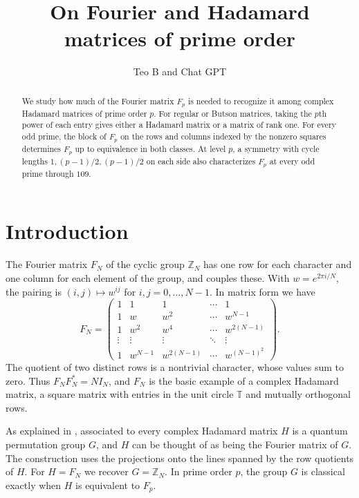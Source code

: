 \documentclass[11pt,a4paper]{article}
\title{On Fourier and Hadamard matrices of prime order}
\author{Teo B and Chat GPT}
\date{}
\numberwithin{equation}{section}
\begin{document}
\maketitle
\begin{abstract}
We study how much of the Fourier matrix $F_p$ is needed to recognize it among complex Hadamard matrices of prime order $p$. For regular or Butson matrices, taking the $p$th power of each entry gives either a Hadamard matrix or a matrix of rank one. For every odd prime, the block of $F_p$ on the rows and columns indexed by the nonzero squares determines $F_p$ up to equivalence in both classes. At level $p$, a symmetry with cycle lengths $1,(p-1)/2,(p-1)/2$ on each side also characterizes $F_p$ at every odd prime through $109$.
\end{abstract}

\begingroup
\color{magenta}
\hypersetup{linkcolor=magenta}
\setlength{\parskip}{0pt}
\makeatletter
\patchcmd{\l@section}{\addvspace{1.0em \@plus\p@}}{\addvspace{0pt}}{}{}
\makeatother
\tableofcontents
\endgroup

\section*{Introduction}
The Fourier matrix $F_N$ of the cyclic group $\mathbb Z_N$ has one row for each character and one column for each element of the group, and couples these. With $w=e^{2\pi i/N}$, the pairing is $(i,j)\mapsto w^{ij}$ for $i,j=0,\ldots,N-1$. In matrix form we have
\[
 F_N=
 \begin{pmatrix}
  1&1&1&\cdots&1\\
  1&w&w^2&\cdots&w^{N-1}\\
  1&w^2&w^4&\cdots&w^{2(N-1)}\\
  \vdots&\vdots&\vdots&\ddots&\vdots\\
  1&w^{N-1}&w^{2(N-1)}&\cdots&w^{(N-1)^2}
 \end{pmatrix}.
\]
The quotient of two distinct rows is a nontrivial character, whose values sum to zero. Thus $F_NF_N^*=NI_N$, and $F_N$ is the basic example of a complex Hadamard matrix, a square matrix with entries in the unit circle $\mathbb T$ and mutually orthogonal rows.

\medskip
As explained in \cite{bbs}, associated to every complex Hadamard matrix $H$ is a quantum permutation group $G$, and $H$ can be thought of as being the Fourier matrix of $G$. The construction uses the projections onto the lines spanned by the row quotients of $H$. For $H=F_N$ we recover $G=\mathbb Z_N$. In prime order $p$, the group $G$ is classical exactly when $H$ is equivalent to $F_p$.
\end{document}
